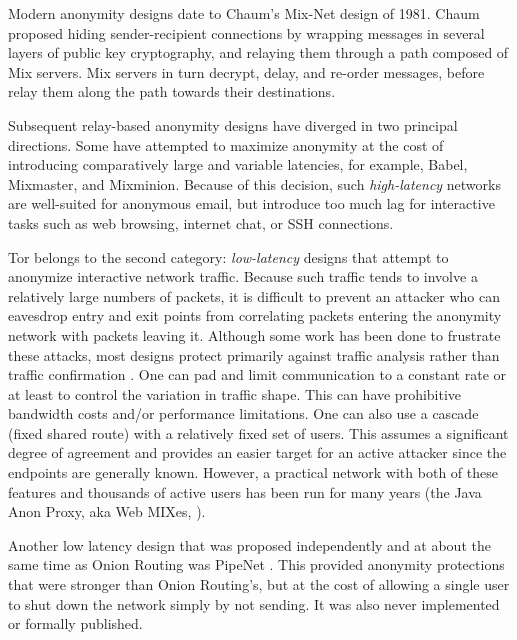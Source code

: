 \documentclass[times,10pt,twocolumn]{article}
\begin{document}

\label{sec:background}

\label{sec:related-work}
Modern anonymity designs date to Chaum's Mix-Net\cite{chaum-mix} design of
1981.  Chaum proposed hiding sender-recipient connections by wrapping
messages in several layers of public key cryptography, and relaying them
through a path composed of Mix servers.  Mix servers in turn decrypt, delay,
and re-order messages, before relay them along the path towards their
destinations.

Subsequent relay-based anonymity designs have diverged in two
principal directions.  Some have attempted to maximize anonymity at
the cost of introducing comparatively large and variable latencies,
for example, Babel\cite{babel}, Mixmaster\cite{mixmaster-spec}, and
Mixminion\cite{minion-design}.  Because of this
decision, such \emph{high-latency} networks are well-suited for anonymous
email, but introduce too much lag for interactive tasks such as web browsing,
internet chat, or SSH connections.

Tor belongs to the second category: \emph{low-latency} designs that
attempt to anonymize interactive network traffic.  Because such
traffic tends to involve a relatively large numbers of packets, it is
difficult to prevent an attacker who can eavesdrop entry and exit
points from correlating packets entering the anonymity network with
packets leaving it. Although some work has been done to frustrate
these attacks, most designs protect primarily against traffic analysis
rather than traffic confirmation \cite{or-jsac98}.  One can pad and
limit communication to a constant rate or at least to control the
variation in traffic shape. This can have prohibitive bandwidth costs
and/or performance limitations. One can also use a cascade (fixed
shared route) with a relatively fixed set of users. This assumes a
significant degree of agreement and provides an easier target for an active
attacker since the endpoints are generally known. However, a practical
network with both of these features and thousands of active users has
been run for many years (the Java Anon Proxy, aka Web MIXes,
\cite{web-mix}).

Another low latency design that was proposed independently and at
about the same time as Onion Routing was PipeNet \cite{pipenet}.
This provided anonymity protections that were stronger than Onion Routing's,
but at the cost of allowing a single user to shut down the network simply
by not sending. It was also never implemented or formally published.
\end{document}
